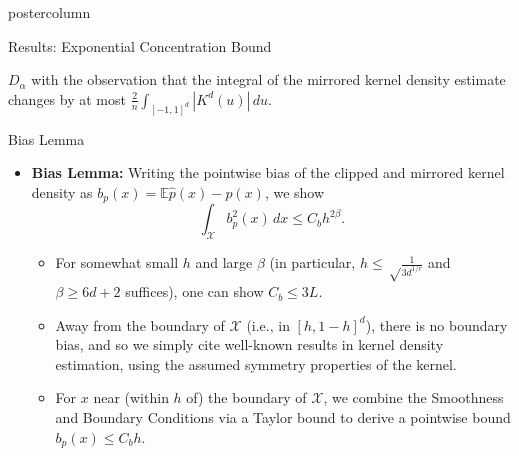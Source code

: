 \documentclass[final,hyperref={pdfpagelabels=false}]{beamer}
\newcommand{\E}{\mathbb{E}}
\newcommand{\X}{\mathcal{X}}
\begin{document}
\begin{frame}
\begin{columns}
\begin{column}{.32\textwidth}
\begin{beamercolorbox}[center,wd=\textwidth]{postercolumn}
\begin{minipage}[T]{.95\textwidth}
{\begin{block}{\normalsize Results: Exponential Concentration Bound}
\begin{itemize}
              $D_\alpha$ with the observation that the integral of the
              mirrored kernel density estimate changes by at most
              $\frac{2}{n} \int_{[-1,1]^d} |K^d(u)| \, du$.
              \end{itemize}
            \end{block}
            \vfill
            \begin{block}{Bias Lemma}
              \begin{itemize}
              \item {\bf\footnotesize Bias Lemma:} Writing the pointwise bias
                    of the clipped and mirrored kernel density as
                    $b_p(x) = \E \hat p(x) - p(x)$, we show
                    \[\int_\X b_p^2(x) \, dx \leq C_b h^{2\beta}.\]
                    \begin{itemize}
                    \item For somewhat small $h$ and large $\beta$ (in
                    particular, $h \leq \sqrt\frac{1}{3d^{1/r}}$ and
                    $\beta \geq 6d + 2$ suffices), one can show $C_b \leq 3L$.
              \item Away from the boundary of $\X$ (i.e., in $[h,1 - h]^d$),
                    there is no boundary bias, and so we simply cite well-known
                    results in kernel density estimation, using the assumed
                    symmetry properties of the kernel.
              \item For $x$ near (within $h$ of) the boundary of $\X$, we
                    combine the Smoothness and Boundary Conditions via a Taylor
                    bound to derive a pointwise bound $b_p(x) \leq C_bh$.
                    \end{itemize}
              \end{itemize}
            \end{block}
            \vfill
          }
        \end{minipage}
      \end{beamercolorbox}
    \end{column}


\end{columns}
\end{frame}
\end{document}
